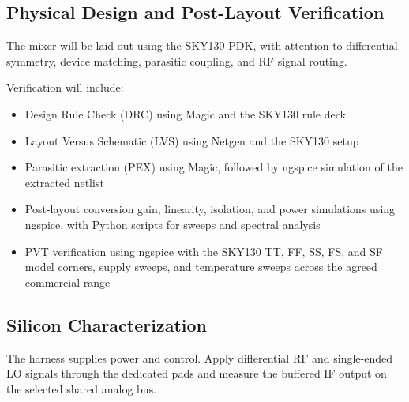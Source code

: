 \subsection{Physical Design and Post-Layout Verification}

The mixer will be laid out using the SKY130 PDK, with attention to differential symmetry, device matching, parasitic coupling, and RF signal routing.

Verification will include:

\begin{itemize}
    \item Design Rule Check (DRC) using Magic and the SKY130 rule deck

    \item Layout Versus Schematic (LVS) using Netgen and the SKY130 setup

    \item Parasitic extraction (PEX) using Magic, followed by ngspice simulation of the extracted netlist

    \item Post-layout conversion gain, linearity, isolation, and power simulations using ngspice, with Python scripts for sweeps and spectral analysis

    \item PVT verification using ngspice with the SKY130 TT, FF, SS, FS, and SF model corners, supply sweeps, and temperature sweeps across the agreed commercial range
\end{itemize}


\subsection{Silicon Characterization}

The harness supplies power and control. Apply differential RF and single-ended LO signals through the dedicated pads and measure the buffered IF output on the selected shared analog bus.

